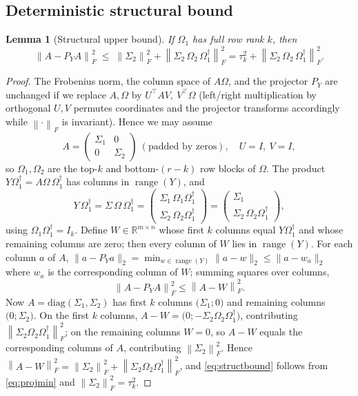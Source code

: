 \documentclass{amsart}
\newtheorem{lemma}{Lemma}
\theoremstyle{definition}
\DeclareMathOperator{\range}{range}
\newcommand{\R}{\mathbb{R}}
\newcommand{\Frob}[1]{\left\lVert #1\right\rVert_F}
\begin{document}
\subsection{Deterministic structural bound}

\begin{lemma}[Structural upper bound]\label{lem:struct}
If $\Omega_1$ has full row rank $k$, then
\begin{equation}\label{eq:structbound}
\Frob{A-P_Y A}^2 \;\le\; \Frob{\Sigma_2}^2
+\Frob{\Sigma_2\,\Omega_2\,\Omega_1^{\dagger}}^2
=\tau_k^2+\Frob{\Sigma_2\,\Omega_2\,\Omega_1^{\dagger}}^2 .
\end{equation}
\end{lemma}

\begin{proof}
The Frobenius norm, the column space of $A\Omega$, and the projector $P_Y$ are
unchanged if we replace $A,\Omega$ by $U^\top A V,\ V^\top\Omega$ (left/right
multiplication by orthogonal $U,V$ permutes coordinates and the projector
transforms accordingly while $\Frob{\cdot}$ is invariant). Hence we may assume
\[
A=\begin{pmatrix}\Sigma_1&0\\0&\Sigma_2\end{pmatrix}\ (\text{padded by zeros}),
\quad U=I,\ V=I,
\]
so $\Omega_1,\Omega_2$ are the top-$k$ and bottom-$(r-k)$ row blocks of
$\Omega$. The product $Y\Omega_1^{\dagger}=A\Omega\,\Omega_1^{\dagger}$ has
columns in $\range(Y)$, and
\[
Y\,\Omega_1^{\dagger}=\Sigma\,\Omega\,\Omega_1^{\dagger}
=\begin{pmatrix}\Sigma_1\,\Omega_1\Omega_1^{\dagger}\\
\Sigma_2\,\Omega_2\Omega_1^{\dagger}\end{pmatrix}
=\begin{pmatrix}\Sigma_1\\ \Sigma_2\,\Omega_2\Omega_1^{\dagger}\end{pmatrix},
\]
using $\Omega_1\Omega_1^{\dagger}=I_k$. Define $W\in\R^{m\times n}$ whose first
$k$ columns equal $Y\Omega_1^{\dagger}$ and whose remaining columns are zero;
then every column of $W$ lies in $\range(Y)$. For each column $a$ of $A$,
$\|a-P_Y a\|_2=\min_{w\in\range(Y)}\|a-w\|_2\le\|a-w_a\|_2$ where $w_a$ is the
corresponding column of $W$; summing squares over columns,
\begin{equation}\label{eq:projmin}
\Frob{A-P_Y A}^2\le\Frob{A-W}^2 .
\end{equation}
Now $A=\mathrm{diag}(\Sigma_1,\Sigma_2)$ has first $k$ columns
$\big(\Sigma_1;0\big)$ and remaining columns $\big(0;\Sigma_2\big)$. On the
first $k$ columns,
$A-W=\big(0;-\Sigma_2\Omega_2\Omega_1^{\dagger}\big)$, contributing
$\Frob{\Sigma_2\Omega_2\Omega_1^{\dagger}}^2$; on the remaining columns
$W=0$, so $A-W$ equals the corresponding columns of $A$, contributing
$\Frob{\Sigma_2}^2$. Hence
$\Frob{A-W}^2=\Frob{\Sigma_2}^2+\Frob{\Sigma_2\Omega_2\Omega_1^{\dagger}}^2$,
and \eqref{eq:structbound} follows from \eqref{eq:projmin} and
$\Frob{\Sigma_2}^2=\tau_k^2$.
\end{proof}
\end{document}
